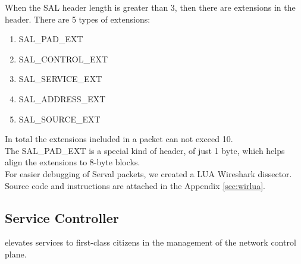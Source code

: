 \newpage
When the SAL header length is greater than 3, then there are extensions in the header.
There are 5 types of extensions:
\begin{enumerate} \itemsep1pt \parskip0pt 
  \item SAL\_PAD\_EXT
  \item SAL\_CONTROL\_EXT
  \item SAL\_SERVICE\_EXT
  \item SAL\_ADDRESS\_EXT
  \item SAL\_SOURCE\_EXT
\end{enumerate}
In total the extensions included in a packet can not exceed 10.
\\ The SAL\_PAD\_EXT is a special kind of header, of just 1 byte, which helps align the extensions to 8-byte blocks.
\\[0.2cm]
\noindent For easier debugging of Serval packets, we created a LUA Wireshark dissector.
Source code and instructions are attached in the Appendix \ref{sec:wirlua}.



\newpage
\subsection{Service Controller}
elevates services to first-class citizens in the management of the network control plane.




